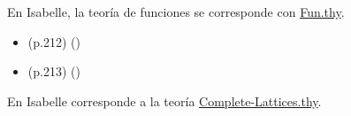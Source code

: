 \begin{isabellebody}
\begin{isamarkuptext}
\begin{itemize}
  \end{itemize}%
\end{isamarkuptext}\isamarkuptrue%
%
\isadelimdocument
%
\endisadelimdocument
%
\isatagdocument
%
\isamarkuptrue%
%
\endisatagdocument
{\isafolddocument}%
%
\isadelimdocument
%
\endisadelimdocument
%
\begin{isamarkuptext}%
En Isabelle, la teoría de funciones se corresponde con 
  \href{https://bit.ly/2VBe1Im}{Fun.thy}.%
\end{isamarkuptext}\isamarkuptrue%
%
\isadelimdocument
%
\endisadelimdocument
%
\isatagdocument
%
\isamarkuptrue%
%
\endisatagdocument
{\isafolddocument}%
%
\isadelimdocument
%
\endisadelimdocument
%
\begin{isamarkuptext}%
\begin{itemize}
    \item (p.212)  
      \hfill ()
    \item (p.213)  
      \hfill ()
  \end{itemize}%
\end{isamarkuptext}\isamarkuptrue%
%
\isadelimdocument
%
\endisadelimdocument
%
\isatagdocument
%
\isamarkuptrue%
%
\endisatagdocument
{\isafolddocument}%
%
\isadelimdocument
%
\endisadelimdocument
%
\begin{isamarkuptext}%
En Isabelle corresponde a la teoría 
  \href{https://bit.ly/2Y5wxKA}{Complete-Lattices.thy}.%
\end{isamarkuptext}\isamarkuptrue%
%
\isadelimdocument
%
\endisadelimdocument
%
\isatagdocument
%
\isamarkuptrue%
%
\isamarkuptrue%
%
\endisatagdocument
{\isafolddocument}%
%
\isadelimdocument
%
\endisadelimdocument
%
\begin{isamarkuptext}%
\begin{itemize}

\end{itemize}
\end{isamarkuptext}
\end{isabellebody}
